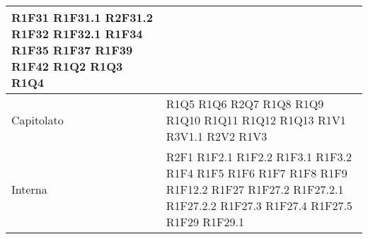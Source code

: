 \begin{center}
\begin{longtable}{|p{44mm}|p{22mm}|}
R1F31 \newline
R1F31.1 \newline
R2F31.2 \newline
R1F32 \newline
R1F32.1 \newline
R1F34 \newline
R1F35 \newline
R1F37 \newline
R1F39 \newline
R1F42 \newline
R1Q2 \newline
R1Q3 \newline
R1Q4
\\
\hline
Capitolato &R1Q5 \newline
R1Q6 \newline
R2Q7 \newline
R1Q8 \newline
R1Q9 \newline
R1Q10 \newline
R1Q11 \newline
R1Q12 \newline
R1Q13 \newline
 R1V1 \newline
R3V1.1 \newline
R2V2 \newline
R1V3 
\\
\hline
Interna &
 R2F1 \newline
R1F2.1 \newline
R1F2.2 \newline
R1F3.1 \newline
R1F3.2 \newline
R1F4 \newline
R1F5 \newline
R1F6 \newline
R1F7 \newline
R1F8 \newline
R1F9 \newline
R1F12.2 \newline
R1F27 \newline
R1F27.2 \newline
R1F27.2.1 \newline
R1F27.2.2 \newline
R1F27.3 \newline
R1F27.4 \newline
R1F27.5 \newline
R1F29 \newline
R1F29.1 \newline

\end{longtable}
\end{center}
